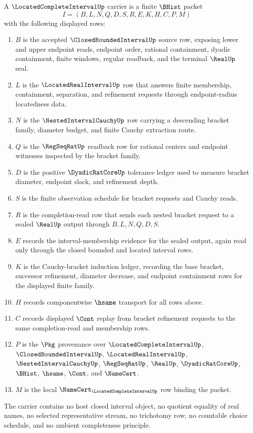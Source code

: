 \begin{definition}
\label{def:located-complete-interval-carrier}
A $\LocatedCompleteIntervalUp$ carrier is a finite $\BHist$ packet
$$
I=(B,L,N,Q,D,S,R,E,K,H,C,P,M)
$$
with the following displayed rows:
\begin{enumerate}
\item $B$ is the accepted $\ClosedBoundedIntervalUp$ source row, exposing lower and upper endpoint reads, endpoint order, rational containment, dyadic containment, finite windows, regular readback, and the terminal $\RealUp$ seal.
\item $L$ is the $\LocatedRealIntervalUp$ row that answers finite membership, containment, separation, and refinement requests through endpoint-radius locatedness data.
\item $N$ is the $\NestedIntervalCauchyUp$ row carrying a descending bracket family, diameter budget, and finite Cauchy extraction route.
\item $Q$ is the $\RegSeqRatUp$ readback row for rational centers and endpoint witnesses inspected by the bracket family.
\item $D$ is the positive $\DyadicRatCoreUp$ tolerance ledger used to measure bracket diameter, endpoint slack, and refinement depth.
\item $S$ is the finite observation schedule for bracket requests and Cauchy reads.
\item $R$ is the completion-read row that sends each nested bracket request to a sealed $\RealUp$ output through $B,L,N,Q,D,S$.
\item $E$ records the interval-membership evidence for the sealed output, again read only through the closed bounded and located interval rows.
\item $K$ is the Cauchy-bracket induction ledger, recording the base bracket, successor refinement, diameter decrease, and endpoint containment rows for the displayed finite family.
\item $H$ records componentwise $\hsame$ transport for all rows above.
\item $C$ records displayed $\Cont$ replay from bracket refinement requests to the same completion-read and membership rows.
\item $P$ is the $\Pkg$ provenance over $\LocatedCompleteIntervalUp$, $\ClosedBoundedIntervalUp$, $\LocatedRealIntervalUp$, $\NestedIntervalCauchyUp$, $\RegSeqRatUp$, $\RealUp$, $\DyadicRatCoreUp$, $\BHist$, $\hsame$, $\Cont$, and $\NameCert$.
\item $M$ is the local $\NameCert_{\LocatedCompleteIntervalUp}$ row binding the packet.
\end{enumerate}
The carrier contains no host closed interval object, no quotient equality of real names, no selected representative stream, no trichotomy row, no countable choice schedule, and no ambient completeness principle.
\end{definition}

